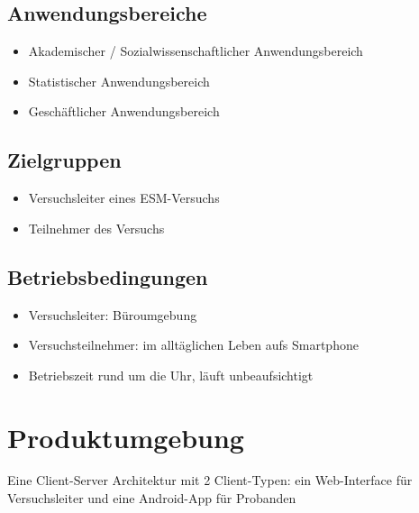 \documentclass[a4paper]{scrreprt}
\begin{document}
        \section{Anwendungsbereiche}
            \begin{itemize}
                \item Akademischer / Sozialwissenschaftlicher Anwendungsbereich
                \item Statistischer Anwendungsbereich
                \item Geschäftlicher Anwendungsbereich
            \end{itemize}

        \section{Zielgruppen}
            \begin{itemize}
                \item \gls{Versuchsleiter} eines ESM-Versuchs
                \item Teilnehmer des Versuchs
            \end{itemize}

        \section{Betriebsbedingungen}
            \begin{itemize}
                \item \gls{Versuchsleiter}: Büroumgebung
                \item Versuchsteilnehmer: im alltäglichen Leben aufs Smartphone
                \item Betriebszeit rund um die Uhr, läuft unbeaufsichtigt
            \end{itemize}

    \chapter{Produktumgebung}
        Eine Client-Server Architektur mit 2 Client-Typen: ein \gls{Web-Interface} für \gls{Versuchsleiter} und eine \gls{Android-App} für \gls{Proband}en
\end{document}
